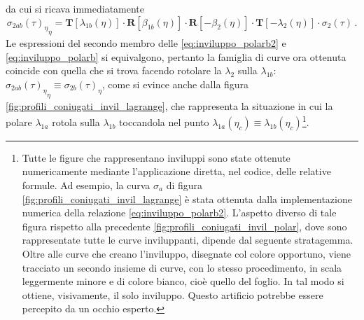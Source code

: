 \noindent da cui si ricava immediatamente
\begin{equation}
{{\sigma_{2ab}(\tau)}_\eta}_\eta = 
 {\bm T}[\lambda_{1b}(\eta)]\cdot {\bm R}[\beta_{1b}(\eta)]\cdot
{\bm R}[-\beta_2(\eta)] \cdot
 {\bm T} [-\lambda_2(\eta)]\cdot \sigma_2(\tau)\,.
\label{eq:inviluppo_polarb2}
\end{equation}
\noindent Le espressioni del secondo membro delle \ref{eq:inviluppo_polarb2}
e \ref{eq:inviluppo_polarb} si equivalgono, pertanto
la famiglia di curve ora ottenuta coincide con quella
che si trova facendo rotolare la $\lambda_2$ sulla $\lambda_{1b}$:
${{\sigma_{2ab}(\tau)}_\eta}_\eta\equiv {\sigma_{2b}(\tau)}_\eta$,
come si evince anche dalla figura
\ref{fig:profili_coniugati_invil_lagrange}, che
rappresenta la situazione in cui la polare $\lambda_{1a}$ rotola sulla
$\lambda_{1b}$ toccandola nel punto
$\lambda_{1a}(\eta_c)\equiv \lambda_{1b}(\eta_c)$\footnote
{
Tutte le figure che rappresentano inviluppi sono state ottenute numericamente
mediante l'applicazione diretta, nel codice, delle relative formule.  Ad esempio,
la curva $\sigma_a$ di figura \ref{fig:profili_coniugati_invil_lagrange} \`e stata
ottenuta dalla implementazione numerica della relazione
\ref{eq:inviluppo_polarb2}. L'aspetto diverso di tale figura
rispetto alla precedente
\ref{fig:profili_coniugati_invil_polar}, dove sono rappresentate tutte le curve
inviluppanti, dipende dal seguente stratagemma.
Oltre alle curve che creano l'inviluppo, disegnate col colore opportuno,
viene tracciato un secondo insieme di curve, con lo stesso procedimento, in
scala leggermente minore e di
colore bianco, cio\`e quello del foglio. In tal modo si ottiene, visivamente,
il solo inviluppo. Questo artificio potrebbe essere percepito da un occhio esperto.}.
